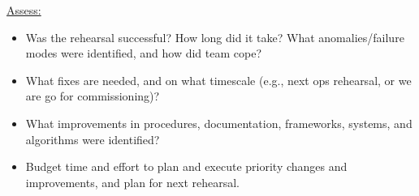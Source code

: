 \clearpage

\underline{Assess:}

\begin{itemize}
\item Was the rehearsal successful? How long did it take? What anomalies/failure modes were identified, and how did team cope? 
\item What fixes are needed, and on what timescale (e.g., next ops rehearsal, or we are go for commissioning)? 
\item What improvements in procedures, documentation, frameworks, systems, and algorithms were identified?
\item Budget time and effort to plan and execute priority changes and improvements, and plan for next rehearsal.
\end{itemize}


